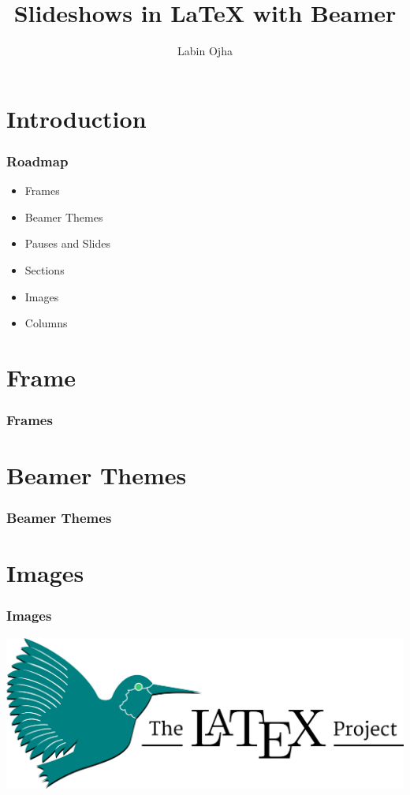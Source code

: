 \documentclass{beamer}
\author{Labin Ojha}
\title{Slideshows in {\LaTeX} with Beamer}
\begin{document}
\maketitle

\section{Introduction}
\begin{frame}
    \frametitle{Roadmap}

    \begin{itemize}
        \item Frames \pause
        \item Beamer Themes \pause
        \item Pauses and Slides \pause
        \item Sections \pause
        \item Images \pause
        \item Columns
    \end{itemize}
\end{frame}

\section{Frame}
\begin{frame}
    \frametitle{Frames}
\end{frame}

\section{Beamer Themes}
\begin{frame}
    \frametitle{Beamer Themes}
\end{frame}

\section{Images}
\begin{frame}
    \frametitle{Images}
    \begin{center}
        \includegraphics[width=.95\textwidth]{LaTeX_project_logo_bird.svg.png}
    \end{center}
\end{frame}
\end{document}
